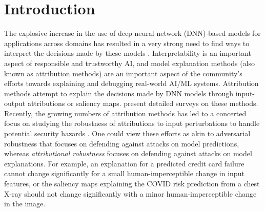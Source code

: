 \documentclass[letterpaper]{article} %
\begin{document}
\section{Introduction}
\label{sec_intro}
The explosive increase in the use of deep neural network (DNN)-based models for applications across domains has resulted in a very strong need to find ways to interpret the decisions made by these models \citep{GadeGKMT20,Tang2021shap,Yap2021rna,Oviedo2022,OhJ20a}. Interpretability is an important aspect of responsible and trustworthy AI, and model explanation methods (also known as attribution methods) are an important aspect of the community's efforts towards explaining and debugging real-world AI/ML systems. %
Attribution methods \citep{zeiler2015deconv,simonyan2014deep,bach2015lrp,Selvaraju_2019,Chattopadhay_2018,SundararajanTY17,shrikumar2017just,smilkov2017smoothgrad,lundberg2017unified} attempt to explain the decisions made by DNN models through input-output attributions or saliency maps. \citep{lipton2018mythos,samek_explainable_2019,fan_interpretability_2021,zhang_survey_2020} present detailed surveys on these methods. %
Recently, the growing numbers of attribution methods has led to a concerted focus on studying the robustness of attributions to input perturbations to handle potential security hazards \citep{chen2019robust,sarkar2020enhanced, Wang22Kendall, agarwal2022rethinking}. One could view these efforts as akin to adversarial robustness that focuses on defending against attacks on model predictions, whereas \textit{attributional robustness} focuses on defending against attacks on model explanations.
For example, an explanation for a predicted credit card failure cannot change significantly for a small human-imperceptible change in input features, or the saliency maps explaining the COVID risk prediction from a chest X-ray should not change significantly with a minor human-imperceptible change in the image. %
\end{document}
